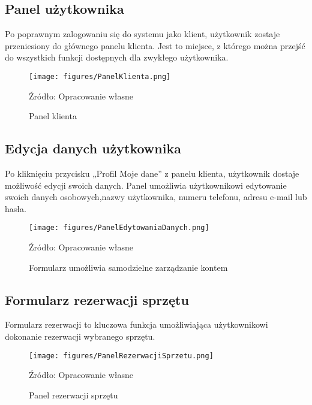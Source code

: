 \subsection{Panel użytkownika}
Po poprawnym zalogowaniu się do systemu jako klient, użytkownik zostaje przeniesiony do głównego panelu klienta. Jest to miejsce, z którego można przejść do wszystkich funkcji dostępnych dla zwykłego użytkownika.
\vspace{-0.2cm} 
\begin{figure}[!htbp]
    \centering
    \texttt{[image: figures/PanelKlienta.png]}
    \caption{Panel klienta}
    \label{fig:panelKlienta}
    \small{Źródło: Opracowanie własne}
\end{figure}
\clearpage

\subsection{Edycja danych użytkownika}
Po kliknięciu przycisku „Profil Moje dane” z panelu klienta, użytkownik dostaje możliwość edycji swoich danych. Panel umożliwia użytkownikowi edytowanie swoich danych osobowych,nazwy użytkownika, numeru telefonu, adresu e-mail lub hasła.
\vspace{-0.2cm}
\begin{figure}[!htbp]
    \centering
    \texttt{[image: figures/PanelEdytowaniaDanych.png]}
    \caption{Formularz umożliwia samodzielne zarządzanie kontem}
    \label{fig:panel_edycji_danych}
    \small{Źródło: Opracowanie własne}
\end{figure}
\clearpage

\subsection{Formularz rezerwacji sprzętu}
Formularz rezerwacji to kluczowa funkcja umożliwiająca użytkownikowi dokonanie rezerwacji wybranego sprzętu. 
\vspace{-0.4cm}
\begin{figure}[!htbp]
    \centering
    \texttt{[image: figures/PanelRezerwacjiSprzetu.png]}
    \caption{Panel rezerwacji sprzętu}
    \label{fig:panelRezerwacjiSprzetow}
    \small{Źródło: Opracowanie własne}
\end{figure}
\clearpage

